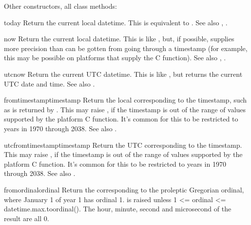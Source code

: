 Other constructors, all class methods:

\begin{methoddesc}{today}{}
    Return the current local datetime.  This is equivalent to
    .
    See also , .
\end{methoddesc}

\begin{methoddesc}{now}{}
    Return the current local datetime.  This is like ,
    but, if possible, supplies more precision than can be gotten from
    going through a  timestamp (for example,
    this may be possible on platforms that supply the C
     function).
    See also , .
\end{methoddesc}

\begin{methoddesc}{utcnow}{}
    Return the current UTC datetime.  This is like , but
    returns the current UTC date and time.
    See also .
\end{methoddesc}

\begin{methoddesc}{fromtimestamp}{timestamp}
    Return the local  corresponding to the \POSIX{}
    timestamp, such as is returned by .  This
    may raise , if the timestamp is out of the
    range of values supported by the platform C
     function.  It's common for this to be
    restricted to years in 1970 through 2038.
    See also .
\end{methoddesc}

\begin{methoddesc}{utcfromtimestamp}{timestamp}
    Return the UTC  corresponding to the \POSIX{}
    timestamp.  This may raise , if the
    timestamp is out of the range of values supported by the platform
    C  function.  It's common for this to be
    restricted to years in 1970 through 2038.
    See also .
\end{methoddesc}

\begin{methoddesc}{fromordinal}{ordinal}
    Return the  corresponding to the proleptic
    Gregorian ordinal, where January 1 of year 1 has ordinal 1.
     is raised unless 1 <= ordinal <=
    datetime.max.toordinal().  The hour, minute, second and
    microsecond of the result are all 0.
\end{methoddesc}

